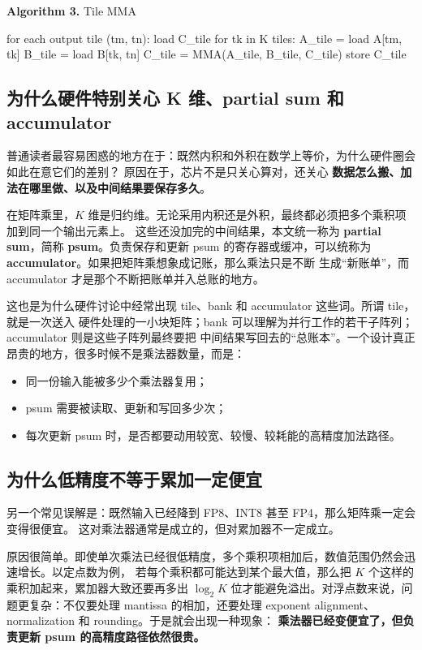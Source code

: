 \documentclass[UTF8,11pt,a4paper]{ctexart}
\begin{document}
\noindent\textbf{Algorithm 3.} Tile MMA
\begin{code}
for each output tile (tm, tn):
  load C_tile
  for tk in K tiles:
    A_tile = load A[tm, tk]
    B_tile = load B[tk, tn]
    C_tile = MMA(A_tile, B_tile, C_tile)
  store C_tile
\end{code}

\subsection{为什么硬件特别关心 K 维、partial sum 和 accumulator}

普通读者最容易困惑的地方在于：既然内积和外积在数学上等价，为什么硬件圈会如此在意它们的差别？
原因在于，芯片不是只关心算对，还关心 \textbf{数据怎么搬、加法在哪里做、以及中间结果要保存多久}。

在矩阵乘里，$K$ 维是归约维。无论采用内积还是外积，最终都必须把多个乘积项加到同一个输出元素上。
这些还没加完的中间结果，本文统一称为 \textbf{partial sum}，简称 \textbf{psum}。负责保存和更新
psum 的寄存器或缓冲，可以统称为 \textbf{accumulator}。如果把矩阵乘想象成记账，那么乘法只是不断
生成“新账单”，而 accumulator 才是那个不断把账单并入总账的地方。

这也是为什么硬件讨论中经常出现 tile、bank 和 accumulator 这些词。所谓 tile，就是一次送入
硬件处理的一小块矩阵；bank 可以理解为并行工作的若干子阵列；accumulator 则是这些子阵列最终要把
中间结果写回去的“总账本”。一个设计真正昂贵的地方，很多时候不是乘法器数量，而是：

\begin{itemize}
  \item 同一份输入能被多少个乘法器复用；
  \item psum 需要被读取、更新和写回多少次；
  \item 每次更新 psum 时，是否都要动用较宽、较慢、较耗能的高精度加法路径。
\end{itemize}

\subsection{为什么低精度不等于累加一定便宜}

另一个常见误解是：既然输入已经降到 FP8、INT8 甚至 FP4，那么矩阵乘一定会变得很便宜。
这对乘法器通常是成立的，但对累加器不一定成立。

原因很简单。即使单次乘法已经很低精度，多个乘积项相加后，数值范围仍然会迅速增长。以定点数为例，
若每个乘积都可能达到某个最大值，那么把 $K$ 个这样的乘积加起来，累加器大致还要再多出
$\log_2 K$ 位才能避免溢出。对浮点数来说，问题更复杂：不仅要处理 mantissa 的相加，还要处理
exponent alignment、normalization 和 rounding。于是就会出现一种现象：
\textbf{乘法器已经变便宜了，但负责更新 psum 的高精度路径依然很贵。}
\end{document}
